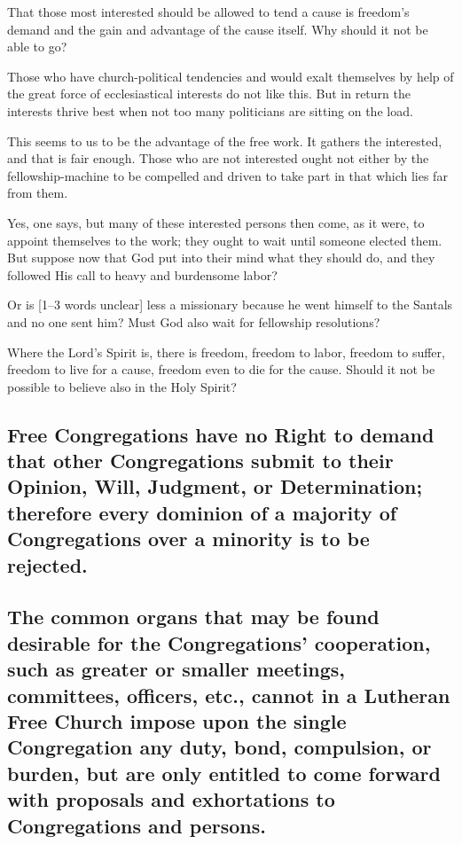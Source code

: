 That those most interested should be allowed to tend a cause is freedom’s demand and the gain and advantage of the cause itself. Why should it not be able to go?

Those who have church-political tendencies and would exalt themselves by help of the great force of ecclesiastical interests do not like this. But in return the interests thrive best when not too many politicians are sitting on the load.

This seems to us to be the advantage of the free work. It gathers the interested, and that is fair enough. Those who are not interested ought not either by the fellowship-machine to be compelled and driven to take part in that which lies far from them.

Yes, one says, but many of these interested persons then come, as it were, to appoint themselves to the work; they ought to wait until someone elected them. But suppose now that God put into their mind what they should do, and they followed His call to heavy and burdensome labor?

Or is [1–3 words unclear] less a missionary because he went himself to the Santals and no one sent him? Must God also wait for fellowship resolutions?

Where the Lord’s Spirit is, there is freedom, freedom to labor, freedom to suffer, freedom to live for a cause, freedom even to die for the cause. Should it not be possible to believe also in the Holy Spirit?






\subsection{Free Congregations have no Right to demand that other Congregations submit to their Opinion, Will, Judgment, or Determination; therefore every dominion of a majority of Congregations over a minority is to be rejected.}

\subsection{The common organs that may be found desirable for the Congregations’ cooperation, such as greater or smaller meetings, committees, officers, etc., cannot in a Lutheran Free Church impose upon the single Congregation any duty, bond, compulsion, or burden, but are only entitled to come forward with proposals and exhortations to Congregations and persons.}


